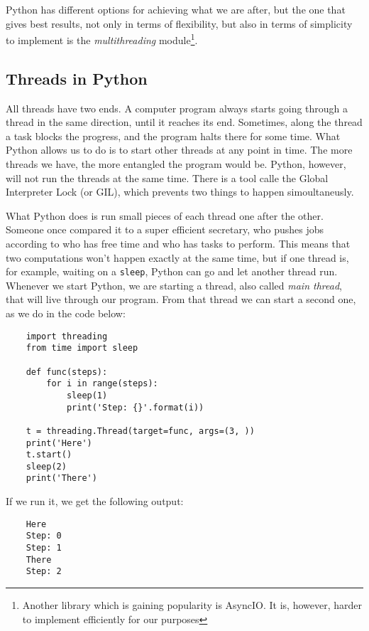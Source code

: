 Python has different options for achieving what we are after, but the one that gives best results, not only in terms of flexibility, but also in terms of simplicity to implement is the \emph{multithreading} module\footnote{Another library which is gaining popularity is AsyncIO. It is, however, harder to implement efficiently for our purposes}.

\subsection{Threads in Python}\label{subsection:multithreading}
All threads have two ends. A computer program always starts going through a thread in the same direction, until it reaches its end. Sometimes, along the thread a task blocks the progress, and the program halts there for some time. What Python allows us to do is to start other threads at any point in time. The more threads we have, the more entangled the program would be. Python, however, will not run the threads at the same time. There is a tool calle the Global Interpreter Lock (or GIL), which prevents two things to happen simoultaneusly.

What Python does is run small pieces of each thread one after the other. Someone once compared it to a super efficient secretary, who pushes jobs according to who has free time and who has tasks to perform. This means that two computations won't happen exactly at the same time, but if one thread is, for example, waiting on a \texttt{sleep}, Python can go and let another thread run. Whenever we start Python, we are starting a thread, also called \emph{main thread}, that will live through our program. From that thread we can start a second one, as we do in the code below:

\begin{verbatim}
    import threading
    from time import sleep

    def func(steps):
        for i in range(steps):
            sleep(1)
            print('Step: {}'.format(i))

    t = threading.Thread(target=func, args=(3, ))
    print('Here')
    t.start()
    sleep(2)
    print('There')
\end{verbatim}

If we run it, we get the following output:

\begin{verbatim}
    Here
    Step: 0
    Step: 1
    There
    Step: 2
\end{verbatim}

